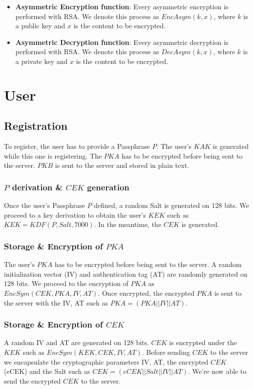 \documentclass[a4paper,10pt]{article}
\begin{document}
\begin{itemize}
    \item \textbf{Asymmetric Encryption function}:
    Every asymmetric encryption is performed with RSA. We denote this process as $EncAsym(k,x)$, where $k$ is a public key and $x$ is the content to be encrypted.
    \item \textbf{Asymmetric Decryption function}:
    Every asymmetric decryption is performed with RSA. We denote this process as $DecAsym(k, x)$, where $k$ is a private key and $x$ is the content to be encrypted.
\end{itemize}

\section{User}
\subsection{Registration}
To register, the user has to provide a Passphrase $P$. The user's $KAK$ is generated while this one is registering. The $PKA$ has to be encrypted before being sent to the server. $PKB$ is sent to the server and stored in plain text.
\subsubsection{$P$ derivation \& $CEK$ generation}
Once the user's Passphrase $P$ defined, a random Salt is generated on 128 bits. We proceed to a key derivation to obtain the user's $KEK$ such as $KEK=KDF(P, Salt, 7000)$. In the meantime, the $CEK$ is generated.
\subsubsection{Storage \& Encryption of $PKA$}
The user's $PKA$ has to be encrypted before being sent to the server. A random initialization vector (IV) and authentication tag (AT) are randomly generated on 128 bits. We proceed to the encryption of $PKA$ as $EncSym(CEK, PKA, IV, AT)$. Once encrypted, the encrypted $PKA$ is sent to the server with the IV, AT such as $PKA=(PKA||IV||AT)$.
\subsubsection{Storage \& Encryption of $CEK$}
A random IV and AT are generated on 128 bits. $CEK$ is encrypted under the $KEK$ such as $EncSym(KEK,CEK, IV, AT)$. Before sending $CEK$ to the server we encapsulate the cryptographic parameters IV, AT, the encrypted $CEK$ (eCEK) and the Salt such as $CEK=(eCEK||Salt||IV||AT)$. We're now able to send the encrypted $CEK$ to the server.
\end{document}
